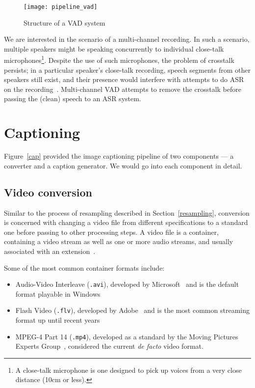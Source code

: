 \begin{figure}[h]
\begin{center}
    \texttt{[image: pipeline\_vad]}
    \caption{Structure of a VAD system}\label{vad}
\end{center}
\end{figure}

We are interested in the scenario of a multi-channel recording. In such a
scenario, multiple speakers might be speaking concurrently to individual
close-talk microphones\footnote{A close-talk microphone is one designed to pick
up voices from a very close distance (10cm or less).}. Despite the use of such
microphones, the problem of crosstalk persists; in a particular speaker's
close-talk recording, speech segments from other speakers still exist, and
their presence would interfere with attempts to do ASR on the
recording~\cite{vad-mc}. Multi-channel VAD attempts
to remove the crosstalk before passing the (clean) speech to an ASR system.

\section{Captioning}\label{sec:lr:cap}

Figure~\ref{cap} provided the image captioning pipeline of two components ---
a converter and a caption generator. We would go into each component in detail.

\subsection{Video conversion}

Similar to the process of resampling described in Section~\ref{resampling},
conversion is concerned with changing a video file from different specifications
to a standard one before passing to other processing steps. A video file
is a container, containing a video stream as well as one or more audio
streams, and usually associated with an extension~\cite{vid}.

Some of the most common container formats include:

\begin{itemize}
    \item Audio-Video Interleave (\texttt{.avi}), developed by
    Microsoft~\cite{avi} and is the default format playable in Windows
    \item Flash Video (\texttt{.flv}), developed by Adobe~\cite{flv} and is
    the most common streaming format up until recent years
    \item MPEG-4 Part 14 (\texttt{.mp4}), developed as a standard by the
    Moving Pictures Experts Group~\cite{mp4}, considered the current
    \textit{de facto} video format.
\end{itemize}


